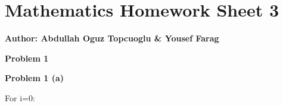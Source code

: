 \documentclass{article}
\begin{document}
\section*{\huge Mathematics Homework Sheet 3}
\begin{flushright}
   \textbf{Author: Abdullah Oguz Topcuoglu \& Yousef Farag}
\end{flushright}

\begin{flushleft}
   \textbf{\Large Problem 1}
\end{flushleft}

\begin{flushleft}
   \textbf{\Large Problem 1 (a)}
\end{flushleft}

For i=0:
\end{document}
